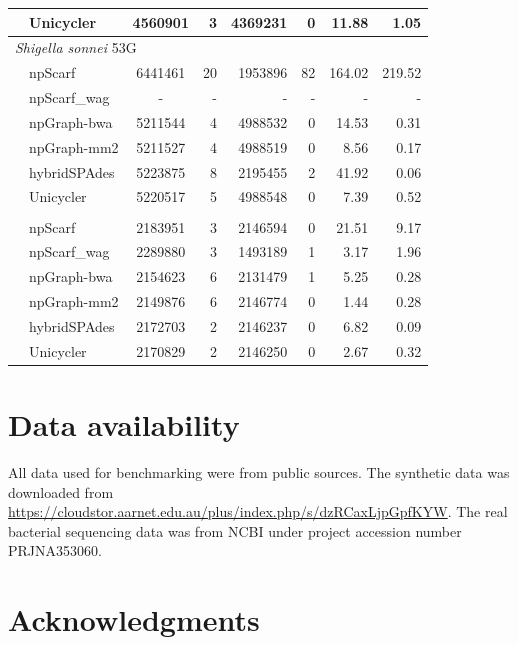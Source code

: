 \documentclass[10pt,letterpaper]{article}
\begin{document}
\begin{longtable}[!hpt]{llcrrrrr}
\rowcolor{Gray}
& Unicycler & 4560901  & 3   &  4369231  &  0  & 11.88  & 1.05 \\
\hline
\multicolumn{8}{l}{\emph{Shigella sonnei} 53G} \\* %
\nobreakmidrule
& npScarf &  6441461 &  20  &  1953896  &  82  & 164.02  &  219.52\\*
& npScarf\_wag & -  &  -  &  -  &  -  & -  &  -\\*
& npGraph-bwa & 5211544  &   4 &  4988532  & 0  & 14.53  &  0.31\\*
& npGraph-mm2 & 5211527  &  4  &   4988519 & 0  &  8.56 &  0.17\\*
& hybridSPAdes & 5223875  &  8  &  2195455  &  2  & 41.92  & 0.06\\*
& Unicycler &  5220517 &  5 &  4988548 & 0  & 7.39  &  0.52\\
\hline
\rowcolor{Gray}
\multicolumn{8}{l}{\emph{Streptococcus suis} BM407} \\* %
\nobreakmidrule
\rowcolor{Gray}
& npScarf &  2183951 & 3   &  2146594  &  0  & 21.51  & 9.17\\*
\rowcolor{Gray}
& npScarf\_wag & 2289880  &  3  &  1493189  &  1  & 3.17  & 1.96\\*
\rowcolor{Gray}
& npGraph-bwa & 2154623  &  6  &  2131479  &  1  & 5.25  & 0.28\\*
\rowcolor{Gray}
& npGraph-mm2 & 2149876  &  6  &  2146774  &  0  & 1.44  & 0.28\\*
\rowcolor{Gray}
& hybridSPAdes & 2172703  &  2  &  2146237  &  0  & 6.82  &  0.09\\*
\rowcolor{Gray}
& Unicycler &  2170829 &   2 &  2146250  &  0  &  2.67 & 0.32 \\
\hline
\end{longtable}

\section*{Data availability}
All data used for benchmarking were from public sources. The synthetic data was downloaded from \url{https://cloudstor.aarnet.edu.au/plus/index.php/s/dzRCaxLjpGpfKYW}. The real bacterial sequencing data was from NCBI under project accession number PRJNA353060.


\section*{Acknowledgments}


\nolinenumbers
\end{document}

